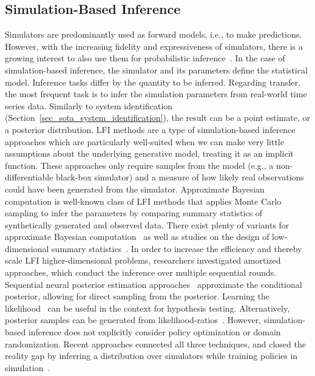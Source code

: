 \documentclass[utf8]{frontiersSCNS} %
\begin{document}
\subsection{Simulation-Based Inference}
\label{sec_sota_sbi}
Simulators are predominantly used as forward models, i.e., to make predictions.
However, with the increasing fidelity and expressiveness of simulators, there is a growing interest to also use them for probabilistic inference~\citep{Cranmer_Louppe_19}.
In the case of simulation-based inference, the simulator and its parameters define the statistical model.
Inference tasks differ by the quantity to be inferred.
Regarding \simtoreal transfer, the most frequent task is to infer the simulation parameters from real-world time series data.
Similarly to system identification (Section~\ref{sec_sota_system_identification}), the result can be a point estimate, or a posterior distribution.
\ac{LFI} methods are a type of simulation-based inference approaches which are particularly well-suited when we can make very little assumptions about the underlying generative model, treating it as an implicit function.
These approaches only require samples from the model (e.g., a non-differentiable black-box simulator) and a measure of how likely real observations could have been generated from the simulator.
Approximate Bayesian computation is well-known class of \ac{LFI} methods that applies Monte Carlo sampling to infer the parameters by comparing summary statistics of synthetically generated and observed data.
There exist plenty of variants for approximate Bayesian computation~\citep{Marjoram_Tavare_03,Beaumont_Robert_09,Sunnaker_Dessimoz_13} as well as studies on the design of low-dimensional summary statistics~\citep{Fearnhead_Prangle_12}.
In order to increase the efficiency and thereby scale \ac{LFI} higher-dimensional problems, researchers investigated amortized approaches, which conduct the inference over multiple sequential rounds.
Sequential neural posterior estimation approaches~\citep{Papamakarios_Murray_16,Lueckmann_Macke_17, Greenberg_Macke_19} approximate the conditional posterior, allowing for direct sampling from the posterior.
Learning the likelihood~\citep{Papamakarios_Murray_19} can be useful in the context for hypothesis testing.
Alternatively, posterior samples can be generated from likelihood-ratios~\citep{Hermans_Louppe_20,Durkan_Papamakarios_20}.
However, simulation-based inference does not explicitly consider policy optimization or domain randomization.
Recent approaches connected all three techniques, and closed the reality gap by inferring a distribution over simulators while training policies in simulation~\citep{Ramos_Fox_19,Barcelos_Ramos_20,Muratore_Peters_21_CoRL}.
\end{document}

